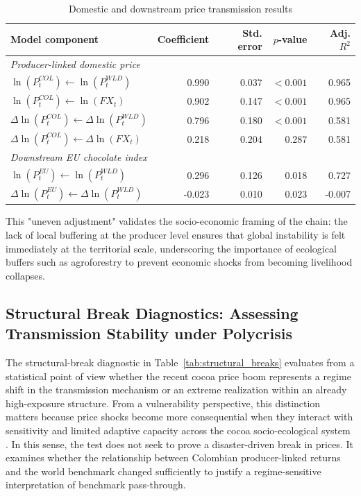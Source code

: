 \documentclass[11pt]{article}
\begin{document}
\begin{table}[H]
\centering
\caption{Domestic and downstream price transmission results}
\label{tab:transmission_results}
\small
\begin{tabular}{lrrrr}
\toprule
Model component & Coefficient & Std. error & $p$-value & Adj. $R^2$ \\
\midrule
\textit{Producer-linked domestic price} & & & & \\
$\ln(P^{COL}_{t}) \leftarrow \ln(P^{WLD}_{t})$ & 0.990 & 0.037 & $<0.001$ & 0.965 \\
$\ln(P^{COL}_{t}) \leftarrow \ln(FX_t)$ & 0.902 & 0.147 & $<0.001$ & 0.965 \\
$\Delta \ln(P^{COL}_{t}) \leftarrow \Delta \ln(P^{WLD}_{t})$ & 0.796 & 0.180 & $<0.001$ & 0.581 \\
$\Delta \ln(P^{COL}_{t}) \leftarrow \Delta \ln(FX_t)$ & 0.218 & 0.204 & 0.287 & 0.581 \\
\midrule
\textit{Downstream EU chocolate index} & & & & \\
$\ln(P^{EU}_{t}) \leftarrow \ln(P^{WLD}_{t})$ & 0.296 & 0.126 & 0.018 & 0.727 \\
$\Delta \ln(P^{EU}_{t}) \leftarrow \Delta \ln(P^{WLD}_{t})$ & -0.023 & 0.010 & 0.023 & -0.007 \\
\bottomrule
\end{tabular}
\end{table}

This "uneven adjustment" validates the socio-economic framing of the chain: the lack of local buffering at the producer level ensures that global instability is felt immediately at the territorial scale, underscoring the importance of ecological buffers such as agroforestry to prevent economic shocks from becoming livelihood collapses.

\subsection{Structural Break Diagnostics: Assessing Transmission Stability under Polycrisis}
\label{sec:structural_breaks}

The structural-break diagnostic in Table~\ref{tab:structural_breaks} evaluates from a statistical point of view whether the recent cocoa price boom represents a regime shift in the transmission mechanism or an extreme realization within an already high-exposure structure. From a vulnerability perspective, this distinction matters because price shocks become more consequential when they interact with sensitivity and limited adaptive capacity across the cocoa socio-ecological system \citep{Turner2003,Adger2006}. In this sense, the test does not seek to prove a disaster-driven break in prices. It examines whether the relationship between Colombian producer-linked returns and the world benchmark changed sufficiently to justify a regime-sensitive interpretation of benchmark pass-through.
\end{document}
